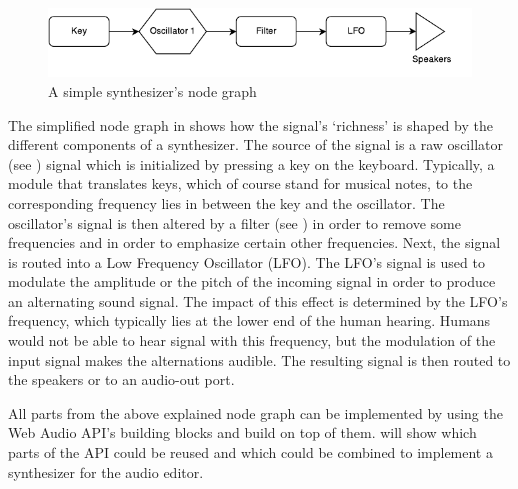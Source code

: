 \medskip

\begin{figure}[htb]
  \centerline{\includegraphics[width=\linewidth]{images/SimpleSynth.pdf}}
  \caption[A simple synthesizer's node graph]{A simple synthesizer's node graph}
  \label{fig:simple-synth-node-graph}
\end{figure}

The simplified node graph in  shows how the signal's `richness' is shaped by the  different components of a synthesizer. The source of the signal is a raw oscillator (see ) signal which is initialized by pressing a key on the keyboard. Typically, a module that translates keys, which of course stand for musical notes, to the corresponding frequency lies in between the key and the oscillator. The oscillator's signal is then altered by a filter (see ) in order to remove some frequencies and in order to emphasize certain other frequencies. Next, the signal is routed into a Low Frequency Oscillator (LFO). The LFO's signal is used to modulate the amplitude or the pitch of the incoming signal in order to produce an alternating sound signal. The impact of this effect is determined by the LFO's frequency, which typically lies at the lower end of the human hearing. Humans would not be able to hear signal with this frequency, but the modulation of the input signal makes the alternations audible. The resulting signal is then routed to the speakers or to an audio-out port.

All parts from the above explained node graph can be implemented by using the Web Audio API's building blocks and build on top of them.  will show which parts of the API could be reused and which could be combined to implement a synthesizer for the audio editor.